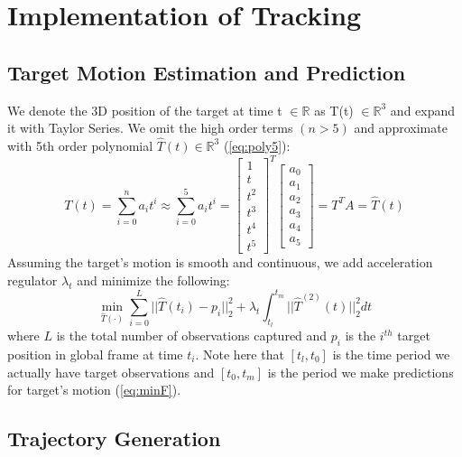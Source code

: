 \chapter{Implementation of Tracking}\label{implementation}

\section{Target Motion Estimation and Prediction}

We denote the 3D position of the target at time t $\in \mathbb{R}$ as T(t) $\in \mathbb{R}^{3}$ and expand it with Taylor Series. We omit the high order terms $(n>5)$ and approximate with 5th order polynomial $\hat{T}(t) \in \mathbb{R}^{3}$ (\ref{eq:poly5}):
\begin{equation}\label{eq:poly5}
T(t) = \sum^n_{i=0} a_{i}t^i
\approx \sum^5_{i=0} a_{i}t^i
= \begin{bmatrix}1\\t\\t^2\\t^3\\t^4\\t^5\end{bmatrix}^T\begin{bmatrix}a_0\\a_1\\a_2\\a_3\\a_4\\a_5\end{bmatrix}
= T^TA = \hat{T}(t)
\end{equation}
\noindent
Assuming the target's motion is smooth and continuous, we add acceleration regulator $\lambda_{t}$ and minimize the following:
\begin{equation}\label{eq:minT}
\min_{\hat{T}(\cdot)} \sum^{L}_{i=0} ||\hat{T}(t_i)-p_i||^2_2 + \lambda_t\int_{t_l}^{t_m} ||\hat{T}^{(2)}(t)||^2_2dt
\end{equation}
\noindent
where $L$ is the total number of observations captured and $p_i$ is the $i^{th}$ target position in global frame at time $t_i$. Note here that $[t_l, t_0]$ is the time period we actually have target observations and $[t_0, t_m]$ is the period we make predictions for target's motion (\ref{eq:minF}).


\section{Trajectory Generation}

